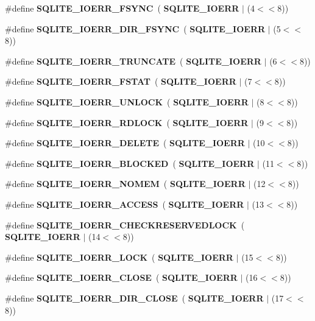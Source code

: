 \begin{DoxyCompactItemize}
\item 
\#define \textbf{ S\+Q\+L\+I\+T\+E\+\_\+\+I\+O\+E\+R\+R\+\_\+\+F\+S\+Y\+NC}~(\textbf{ S\+Q\+L\+I\+T\+E\+\_\+\+I\+O\+E\+RR} $\vert$ (4$<$$<$8))
\item 
\#define \textbf{ S\+Q\+L\+I\+T\+E\+\_\+\+I\+O\+E\+R\+R\+\_\+\+D\+I\+R\+\_\+\+F\+S\+Y\+NC}~(\textbf{ S\+Q\+L\+I\+T\+E\+\_\+\+I\+O\+E\+RR} $\vert$ (5$<$$<$8))
\item 
\#define \textbf{ S\+Q\+L\+I\+T\+E\+\_\+\+I\+O\+E\+R\+R\+\_\+\+T\+R\+U\+N\+C\+A\+TE}~(\textbf{ S\+Q\+L\+I\+T\+E\+\_\+\+I\+O\+E\+RR} $\vert$ (6$<$$<$8))
\item 
\#define \textbf{ S\+Q\+L\+I\+T\+E\+\_\+\+I\+O\+E\+R\+R\+\_\+\+F\+S\+T\+AT}~(\textbf{ S\+Q\+L\+I\+T\+E\+\_\+\+I\+O\+E\+RR} $\vert$ (7$<$$<$8))
\item 
\#define \textbf{ S\+Q\+L\+I\+T\+E\+\_\+\+I\+O\+E\+R\+R\+\_\+\+U\+N\+L\+O\+CK}~(\textbf{ S\+Q\+L\+I\+T\+E\+\_\+\+I\+O\+E\+RR} $\vert$ (8$<$$<$8))
\item 
\#define \textbf{ S\+Q\+L\+I\+T\+E\+\_\+\+I\+O\+E\+R\+R\+\_\+\+R\+D\+L\+O\+CK}~(\textbf{ S\+Q\+L\+I\+T\+E\+\_\+\+I\+O\+E\+RR} $\vert$ (9$<$$<$8))
\item 
\#define \textbf{ S\+Q\+L\+I\+T\+E\+\_\+\+I\+O\+E\+R\+R\+\_\+\+D\+E\+L\+E\+TE}~(\textbf{ S\+Q\+L\+I\+T\+E\+\_\+\+I\+O\+E\+RR} $\vert$ (10$<$$<$8))
\item 
\#define \textbf{ S\+Q\+L\+I\+T\+E\+\_\+\+I\+O\+E\+R\+R\+\_\+\+B\+L\+O\+C\+K\+ED}~(\textbf{ S\+Q\+L\+I\+T\+E\+\_\+\+I\+O\+E\+RR} $\vert$ (11$<$$<$8))
\item 
\#define \textbf{ S\+Q\+L\+I\+T\+E\+\_\+\+I\+O\+E\+R\+R\+\_\+\+N\+O\+M\+EM}~(\textbf{ S\+Q\+L\+I\+T\+E\+\_\+\+I\+O\+E\+RR} $\vert$ (12$<$$<$8))
\item 
\#define \textbf{ S\+Q\+L\+I\+T\+E\+\_\+\+I\+O\+E\+R\+R\+\_\+\+A\+C\+C\+E\+SS}~(\textbf{ S\+Q\+L\+I\+T\+E\+\_\+\+I\+O\+E\+RR} $\vert$ (13$<$$<$8))
\item 
\#define \textbf{ S\+Q\+L\+I\+T\+E\+\_\+\+I\+O\+E\+R\+R\+\_\+\+C\+H\+E\+C\+K\+R\+E\+S\+E\+R\+V\+E\+D\+L\+O\+CK}~(\textbf{ S\+Q\+L\+I\+T\+E\+\_\+\+I\+O\+E\+RR} $\vert$ (14$<$$<$8))
\item 
\#define \textbf{ S\+Q\+L\+I\+T\+E\+\_\+\+I\+O\+E\+R\+R\+\_\+\+L\+O\+CK}~(\textbf{ S\+Q\+L\+I\+T\+E\+\_\+\+I\+O\+E\+RR} $\vert$ (15$<$$<$8))
\item 
\#define \textbf{ S\+Q\+L\+I\+T\+E\+\_\+\+I\+O\+E\+R\+R\+\_\+\+C\+L\+O\+SE}~(\textbf{ S\+Q\+L\+I\+T\+E\+\_\+\+I\+O\+E\+RR} $\vert$ (16$<$$<$8))
\item 
\#define \textbf{ S\+Q\+L\+I\+T\+E\+\_\+\+I\+O\+E\+R\+R\+\_\+\+D\+I\+R\+\_\+\+C\+L\+O\+SE}~(\textbf{ S\+Q\+L\+I\+T\+E\+\_\+\+I\+O\+E\+RR} $\vert$ (17$<$$<$8))

\end{DoxyCompactItemize}
